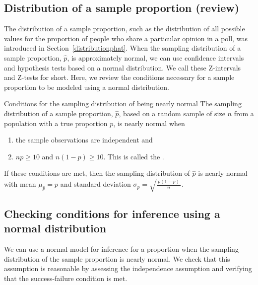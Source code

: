 \subsection{Distribution of a sample proportion (review)}

The distribution of a sample proportion, such as the distribution of all possible values for the proportion of people who share a particular opinion in a poll, was introduced in Section~\ref{distributionphat}.  When the sampling distribution of a sample proportion, $\hat{p}$, is approximately normal, we can use confidence intervals and hypothesis tests based on a normal distribution.  We call these Z-intervals and Z-tests for short.  Here, we review the conditions necessary for a sample proportion to be modeled using a normal distribution.

\begin{onebox}{Conditions for the sampling distribution of  being nearly normal}
The sampling distribution of a sample proportion, $\hat{p}$, based on a random sample of size $n$ from a population with a true proportion $p$, is nearly normal when
\begin{enumerate}
\item the sample observations are independent and
\item $np\geq10$ and $n(1-p)\geq10$. This is called the .
\end{enumerate}
If these conditions are met, then the sampling distribution of $\hat{p}$ is nearly normal with mean $\mu_{\hat{p}}=p$ and standard deviation $\sigma_{\hat{p}} = \sqrt{\frac{\ p(1-p)\ }{n}}$.\end{onebox}

\subsection{Checking conditions for inference using a normal distribution}
We can use a normal model for inference for a proportion when the sampling distribution of the sample proportion is nearly normal.  We check that this assumption is reasonable by assessing the independence assumption and verifying that the success-failure condition is met. 

